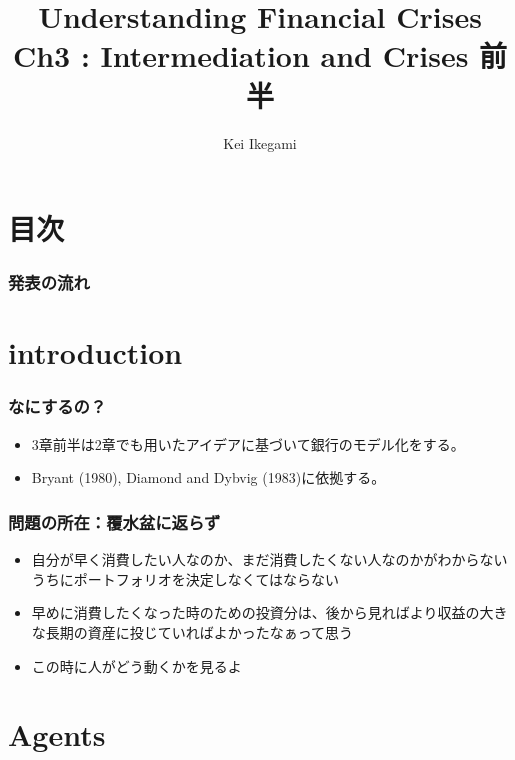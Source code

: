 \documentclass[dvipdfmx, 12pt]{beamer}
\title{Understanding Financial Crises\\Ch3 : Intermediation and Crises 前半}
\author{Kei Ikegami}
\begin{document}
\newcommand{\argmin}{\mathop{\rm arg~min}\limits}

\frame{\maketitle}

\section*{目次}
\begin{frame} \frametitle{発表の流れ}
\tableofcontents
\end{frame}

\section{introduction}
\begin{frame}\frametitle{なにするの？}
	\begin{itemize}
		\item 3章前半は2章でも用いたアイデアに基づいて銀行のモデル化をする。
		\item Bryant (1980), Diamond and Dybvig (1983)に依拠する。
	\end{itemize}
\end{frame}
\begin{frame}\frametitle{問題の所在：覆水盆に返らず}
	\begin{itemize}
		\item 自分が早く消費したい人なのか、まだ消費したくない人なのかがわからないうちにポートフォリオを決定しなくてはならない
		\item 早めに消費したくなった時のための投資分は、後から見ればより収益の大きな長期の資産に投じていればよかったなぁって思う
		\item この時に人がどう動くかを見るよ
	\end{itemize}
\end{frame}


\section{Agents}
\end{document}
